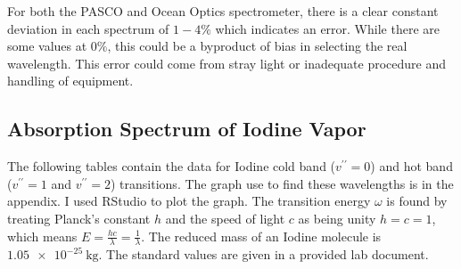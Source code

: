 \documentclass[12pt]{article}
\begin{document}
	For both the PASCO and Ocean Optics spectrometer, there is a clear constant deviation in each spectrum of $1-4 \%$ which indicates an error. While there are some values at $0 \%$, this could be a byproduct of bias in selecting the real wavelength. This error could come from stray light or inadequate procedure and handling of equipment.
	
\clearpage
	
	\subsection{Absorption Spectrum of Iodine Vapor}
	
	The following tables contain the data for Iodine cold band ($v^{\prime\prime} = 0$) and hot band ($v^{\prime\prime} = 1$ and $v^{\prime\prime} = 2$) transitions. The graph use to find these wavelengths is in the appendix. I used RStudio to plot the graph. The transition energy $\omega$ is found by treating Planck's constant $h$ and the speed of light $c$ as being unity $h = c = 1$, which means $E = \frac{hc}{\lambda} = \frac{1}{\lambda}$. The reduced mass of an Iodine molecule is $\qty{1.05e-25}{\kilogram}$. The standard values are given in a provided lab document.
	
	
\end{document}
